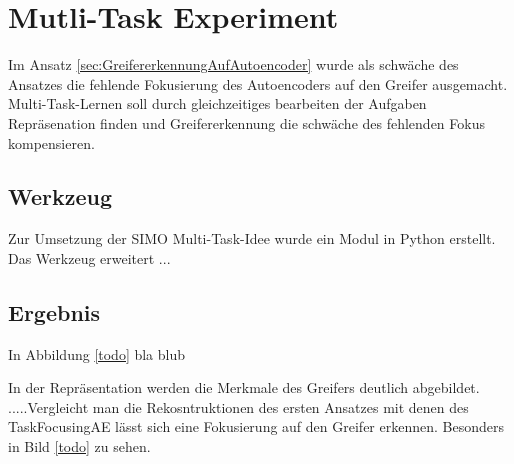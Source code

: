 	\section{Mutli-Task Experiment}
	\label{sec:MultiTaskExperiment}
	Im Ansatz \ref{sec:GreifererkennungAufAutoencoder} wurde als schwäche des Ansatzes die fehlende Fokusierung des Autoencoders auf den Greifer ausgemacht. Multi-Task-Lernen soll durch gleichzeitiges bearbeiten der Aufgaben Repräsenation finden und Greifererkennung die schwäche des fehlenden Fokus kompensieren.   
	\subsection{Werkzeug}
	Zur Umsetzung der SIMO Multi-Task-Idee wurde ein Modul in Python erstellt. Das Werkzeug erweitert ...  
	\subsection{Ergebnis}
	In Abbildung \ref{todo} bla blub
	
	In der Repräsentation werden die Merkmale des Greifers deutlich abgebildet. .....Vergleicht man die Rekosntruktionen des ersten Ansatzes mit denen des TaskFocusingAE lässt sich eine Fokusierung auf den Greifer erkennen. Besonders in Bild \ref{todo} zu sehen.
	
